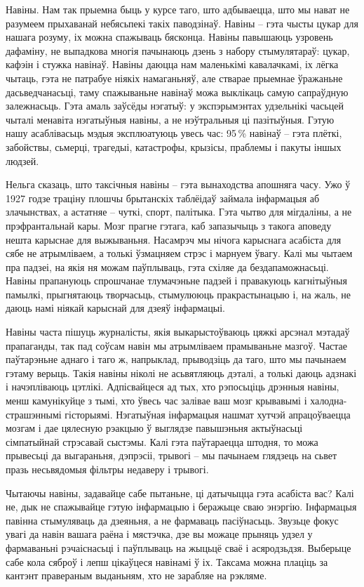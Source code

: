 Навіны. Нам так прыемна быць у курсе таго, што адбываецца, што мы нават не разумеем прыхаванай небясьпекі такіх паводзінаў. Навіны – гэта чысты цукар для нашага розуму, іх можна спажываць бясконца. Навіны павышаюць узровень дафаміну, не выпадкова многія пачынаюць дзень з набору стымулятараў: цукар, кафэін і стужка навінаў. Навіны даюцца нам маленькімі кавалачкамі, іх лёгка чытаць, гэта не патрабуе ніякіх намаганьняў, але стварае прыемнае ўражаньне дасьведчанасьці, таму спажываньне навінаў можа выклікаць самую сапраўдную залежнасьць. Гэта амаль заўсёды нэгатыў: у экспэрымэнтах удзельнікі часьцей чыталі менавіта нэгатыўныя навіны, а не нэўтральныя ці пазітыўныя. Гэтую нашу асаблівасьць мэдыя эксплюатуюць увесь час: 95\,\% навінаў – гэта плёткі, забойствы, сьмерці, трагедыі, катастрофы, крызісы, праблемы і пакуты іншых людзей.

Нельга сказаць, што таксічныя навіны – гэта вынаходства апошняга часу. Ужо ў 1927 годзе траціну плошчы брытанскіх таблёідаў займала інфармацыя аб злачынствах, а астатняе – чуткі, спорт, палітыка. Гэта чытво для мігдаліны, а не прэфрантальнай кары. Мозг прагне гэтага, каб запазычыць з такога аповеду нешта карыснае для выжываньня. Насамрэч мы нічога карыснага асабіста для сябе не атрымліваем, а толькі ўзмацняем стрэс і марнуем ўвагу. Калі мы чытаем пра падзеі, на якія ня можам паўплываць, гэта схіляе да бездапаможнасьці. Навіны прапануюць спрошчанае тлумачэньне падзей і правакуюць кагнітыўныя памылкі, прыгнятаюць творчасьць, стымулююць пракрастынацыю і, на жаль, не даюць намі ніякай карыснай для дзеяў інфармацыі.

Навіны часта пішуць журналісты, якія выкарыстоўваюць цяжкі арсэнал мэтадаў прапаганды, так пад соўсам навін мы атрымліваем прамываньне мазгоў. Частае паўтарэньне аднаго і таго ж, напрыклад, прыводзіць да таго, што мы пачынаем гэтаму верыць. Такія навіны ніколі не асьвятляюць дэталі, а толькі даюць адзнакі і начэпліваюць цэтлікі. Адпісвайцеся ад тых, хто рэпосьціць дрэнныя навіны, менш камунікуйце з тымі, хто ўвесь час залівае ваш мозг крывавымі і халодна-страшэннымі гісторыямі. Нэгатыўная інфармацыя нашмат хутчэй апрацоўваецца мозгам і дае цялесную рэакцыю ў выглядзе павышэньня актыўнасьці сімпатыйнай стрэсавай сыстэмы. Калі гэта паўтараецца штодня, то можа прывесьці да выгараньня, дэпрэсіі, трывогі – мы пачынаем глядзець на сьвет празь несьвядомыя фільтры недаверу і трывогі.

Чытаючы навіны, задавайце сабе пытаньне, ці датычыцца гэта асабіста вас? Калі не, дык не спажывайце гэтую інфармацыю і беражыце сваю энэргію. Інфармацыя павінна стымуляваць да дзеяньня, а не фармаваць пасіўнасьць. Звузьце фокус увагі да навін вашага раёна і мястэчка, дзе вы можаце прыняць удзел у фармаваньні рэчаіснасьці і паўплываць на жыцьцё сваё і асяродзьдзя. Выберыце сабе кола сяброў і лепш цікаўцеся навінамі ў іх. Таксама можна плаціць за кантэнт правераным выданьням, хто не зарабляе на рэкляме.


